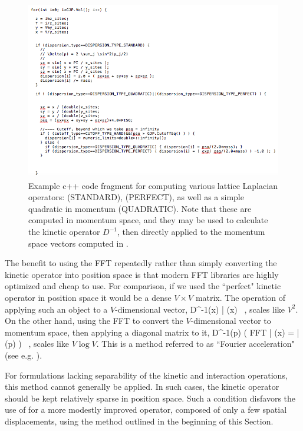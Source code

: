 \begin{figure}
\caption{\label{fig:dispersion}Example c++ code fragment for computing various lattice Laplacian operators:  (STANDARD),  (PERFECT), as well as a simple quadratic in momentum (QUADRATIC). Note that these are computed in momentum space, and they may be used to calculate the kinetic operator $D^{-1}$, then directly applied to the momentum space vectors computed in .}
\includegraphics[width=0.9\linewidth]{Chapter5-figures/dispersion}
\end{figure}

The benefit to using the FFT repeatedly rather than simply converting the kinetic operator into position space is that modern FFT libraries are highly optimized and cheap to use. For comparison, if we used the ``perfect" kinetic operator in position space it would be a dense $V\times V$ matrix. The operation of applying such an object to a $V$-dimensional vector,
\beq
D^{-1}(x) | \psi(x) \rangle \ ,
\eeq
scales like $V^2$. On the other hand, using the FFT to convert the $V$-dimensional vector to momentum space, then applying a diagonal matrix to it,
\beq
D^{-1}(p) \left( \mbox{FFT} | \psi(x) \rangle = | \tilde{\psi}(p) \rangle \right) \ ,
\eeq
scales like $V \log V$. This is a method referred to as ``Fourier acceleration" (see e.g. \cite{Batrouni,Daviesetal1,Daviesetal2,Katzetal1}). 

For formulations lacking separability of the kinetic and interaction operations, this method cannot generally be applied. In such cases, the kinetic operator should be kept relatively sparse in position space. Such a condition disfavors the use of  for a more modestly improved operator, composed of only a few spatial displacements, using the method outlined in the beginning of this Section.

